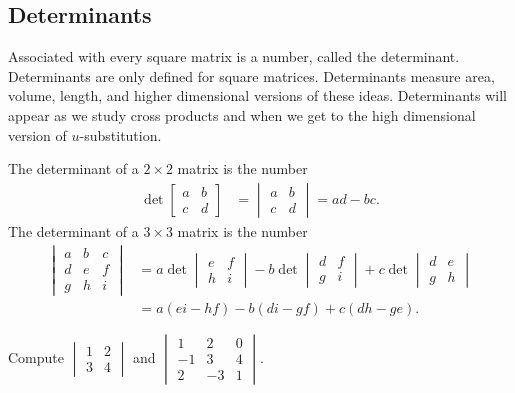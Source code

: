 \subsection{Determinants}


Associated with every square matrix is a number, called the determinant.  Determinants are only defined for square matrices.
Determinants measure area, volume, length, and higher dimensional versions of these ideas.  Determinants will appear as we study cross products and when we get to the high dimensional version of {$u$}-substitution.
\begin{definition}
The determinant of a {$2\times 2$} matrix is the number 
\begin{align*}
\det\begin{bmatrix}a&b\\c&d\end{bmatrix} &=\begin{vmatrix}a&b\\c&d\end{vmatrix} = ad-bc.
\end{align*}
The determinant of a {$3\times 3$} matrix is the number 
\begin{align*}
\begin{vmatrix}a&b&c\\d&e&f\\g&h&i\end{vmatrix} &= a\det\begin{vmatrix}e&f\\h&i\end{vmatrix} -b\det\begin{vmatrix}d&f\\g&i\end{vmatrix} +c\det\begin{vmatrix}d&e\\g&h\end{vmatrix}\\
&=a(ei-hf)-b(di-gf)+c(dh-ge).
\end{align*}
\end{definition}

\begin{problem}
Compute 
$\begin{vmatrix}
1&2\\
3&4
\end{vmatrix} 
$
and 
$\begin{vmatrix}
1&2&0\\
-1&3&4\\
2&-3&1
\end{vmatrix} 
$.
\end{problem}

